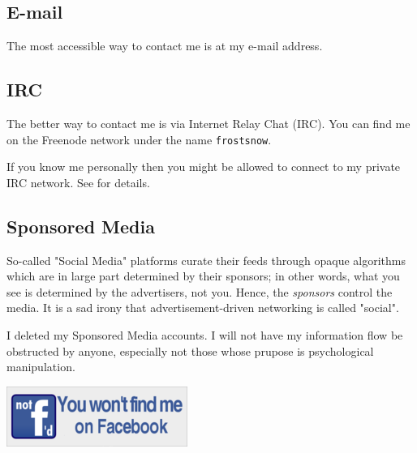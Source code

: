 \documentclass{article}
\begin{document}
\subsection{E-mail}
The most accessible way to contact me is at my e-mail address.

\subsection{IRC}
The better way to contact me is via Internet Relay Chat (IRC).  You can find me on the Freenode network under the name \texttt{frostsnow}.

If you know me personally then you might be allowed to connect to my private IRC network.  See  for details.

\subsection{Sponsored Media}
So-called "Social Media" platforms curate their feeds through opaque algorithms which are in large part determined by their sponsors; in other words, what you see is determined by the advertisers, not you.  Hence, the \emph{sponsors} control the media.  It is a sad irony that advertisement-driven networking is called "social".

I deleted my Sponsored Media accounts.  I will not have my information flow be obstructed by anyone, especially not those whose prupose is psychological manipulation.

{\centering \includegraphics{files/no-facebook.png}}
\end{document}
